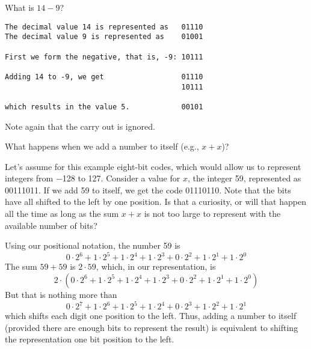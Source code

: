 \documentclass{patt}
\begin{document}
\begin{example}
What is $14-9$?

\medskip

\hspace*{-1.5pc}\begin{minipage}{27.5pc}
\color{seventyblack}%
\begin{Verbatim}[fontsize=\fontsize{9}{14}\selectfont]
The decimal value 14 is represented as   01110
The decimal value 9 is represented as    01001

First we form the negative, that is, -9: 10111

Adding 14 to -9, we get                  01110
                                         10111

which results in the value 5.            00101
\end{Verbatim}
\end{minipage}

\bigskip

\noindent
Note again that the carry out is ignored.
\end{example}\vspace{-10pt}

\begin{example}
What happens when we add a number to itself (e.g., $x+x$)?

Let's assume for this example eight-bit codes, which would allow us to
represent integers from $-$128 to 127.  Consider a
value for $x$, the integer 59, represented as 00111011.  If we add 59
to itself, we get the code 01110110.  Note that the bits have all
shifted to the left by one position.  Is that a curiosity, or will
that happen all the time as long as the sum $x+x$ is not too large to
represent with the available number of bits?

Using our positional notation, the number 59 is
\begin{equation*}
0\cdot 2^6+1\cdot 2^5+1\cdot 2^4+1\cdot 2^3+0\cdot 2^2+1\cdot 2^1+1\cdot 2^0
\end{equation*}
The sum $59+59$ is $2\cdot59$, which, in our representation, is
\begin{equation*}
2\cdot(0\cdot 2^6+1\cdot 2^5+1\cdot 2^4+1\cdot2^3+0\cdot2^2+1\cdot 2^1+1\cdot 2^0)
\end{equation*}
But that is nothing more than
\begin{equation*}
0\cdot 2^7+1\cdot 2^6+1\cdot 2^5+1\cdot 2^4+0\cdot 2^3+1\cdot 2^2+1\cdot 2^1
\end{equation*}
which shifts each digit one position to the left.  Thus, adding a
number to itself (provided there are enough bits to represent the
result) is equivalent to shifting the representation one bit position
to the left.
\end{example}\vspace{-10pt}
\end{document}
